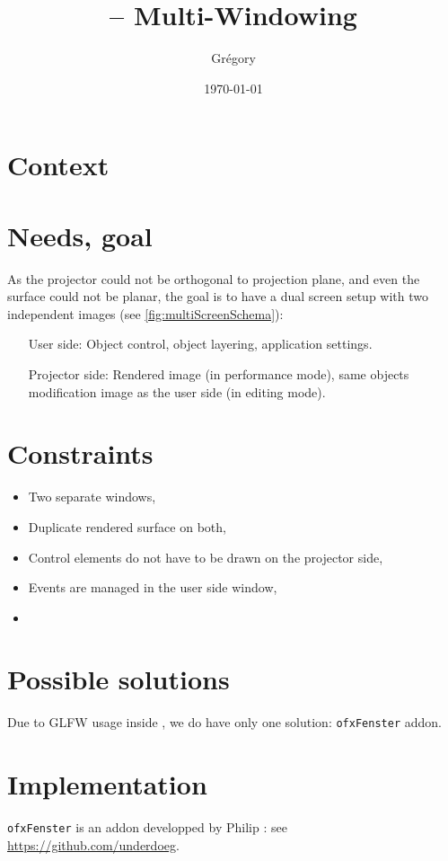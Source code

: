\documentclass[a4paper,titlepage,oneside]{article}
\author{Grégory \bsc{David}}
\title{\vilain{} -- Multi-Windowing}
\date{\today{}}
\newcommand{\ofxFenster}{\texttt{ofxFenster}}
\begin{document}
\maketitle{}
\tableofcontents{}
\newpage

\section{Context}


\section{Needs, goal}
As the projector could not be orthogonal to projection plane, and even
the surface could not be planar, the goal is to have a dual screen
setup with two independent images (see \figurename{}
\vref{fig:multiScreenSchema}):
\begin{enumerate}
    \item [User side:] Object control, object layering, application
    settings.
    \item [Projector side:] Rendered image (in performance mode), same
    objects modification image as the user side (in editing mode).
\end{enumerate}


\section{Constraints}
\begin{itemize}
    \item Two separate windows,
    \item Duplicate rendered surface on both,
    \item Control elements do not have to be drawn on the projector
    side,
    \item Events are managed in the user side window,
    \item
\end{itemize}

\section{Possible solutions}
Due to GLFW usage inside \OF{}, we do have only one solution:
\texttt{ofxFenster} addon.

\section{Implementation}
\ofxFenster{} is an addon developped by Philip : see
\url{https://github.com/underdoeg}.
\end{document}
